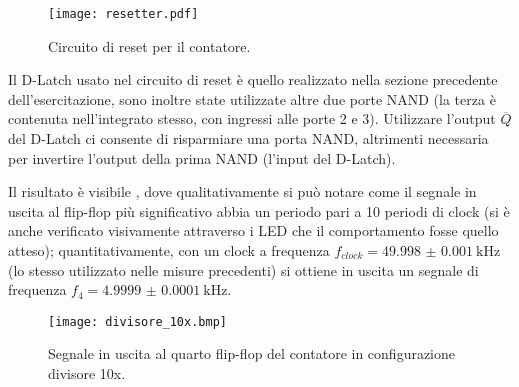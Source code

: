 \begin{figure}[h]
	\centering
	\texttt{[image: resetter.pdf]}
	\caption{Circuito di reset per il contatore.}
	\label{fig:reset}
\end{figure}

Il D-Latch usato nel circuito di reset è quello realizzato nella sezione precedente dell'esercitazione, sono inoltre state utilizzate altre due porte NAND (la terza è contenuta nell'integrato stesso, con ingressi alle porte 2 e 3). Utilizzare l'output $\overline{Q}$ del D-Latch ci consente di risparmiare una porta NAND, altrimenti necessaria per invertire l'output della prima NAND (l'input del D-Latch).

Il risultato è visibile , dove qualitativamente si può notare come il segnale in uscita al flip-flop più significativo abbia un periodo pari a 10 periodi di clock (si è anche verificato visivamente attraverso i LED che il comportamento fosse quello atteso); quantitativamente, con un clock a frequenza $f_{clock} = \SI{49.998(1)}{ \kilo \hertz}$ (lo stesso utilizzato nelle misure precedenti) si ottiene in uscita un segnale di frequenza $f_{4} = \SI{4.9999(1)}{ \kilo \hertz}$.

\begin{figure}[h]
	\centering
	\texttt{[image: divisore\_10x.bmp]}
	\caption{Segnale in uscita al quarto flip-flop del contatore in configurazione divisore 10x.}
	\label{fig:div10}
\end{figure}

